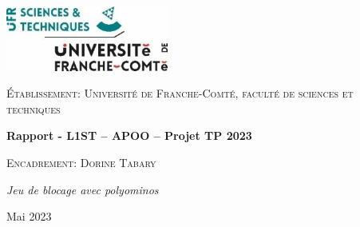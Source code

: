 \centering
\includegraphics[width=0.4\textwidth, scale=2]{ufrst.jpg}\par
\vspace{1cm}
{\scshape\Large Établissement: Université de Franche-Comté, faculté de sciences et techniques \par}
\vspace{2cm}
{\huge\bfseries Rapport - L1ST – APOO – Projet TP 2023 \par}
\vspace{2cm}
{\scshape\Large Encadrement: Dorine Tabary \par}
\vfill
{\Large\itshape Jeu de blocage avec polyominos \par}
\vfill
\vfill
{\large Mai 2023\par}
